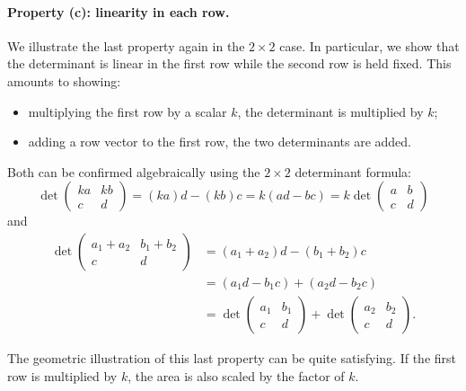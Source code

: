 \documentclass{ximera}
\begin{document}
\paragraph{Property (c): linearity in each row.}
We illustrate the last property again in the $2 \times 2$ case. In
particular, we show that the determinant is linear in the first row
while the second row is held fixed. This amounts to showing:
\begin{itemize}
\item multiplying the first row by a scalar $k$, the determinant is
  multiplied by $k$;
\item adding a row vector to the first row, the two determinants are added.
\end{itemize}

Both can be confirmed algebraically using the $2 \times 2$ determinant
formula:
\[
  \det
  \begin{pmatrix}
    k a & k b \\
    c & d
  \end{pmatrix}
  = (k a)d - (k b)c
  = k (ad - bc)
  = k \det
  \begin{pmatrix}
    a & b \\
    c & d
  \end{pmatrix}
\]
and
\begin{align*}
  \det
  \begin{pmatrix}
    a_1 + a_2 & b_1 + b_2 \\
    c & d
  \end{pmatrix}
  & = (a_1 + a_2) d - (b_1 + b_2) c \\
              & = (a_1 d - b_1 c) + (a_2 d - b_2 c) \\
              & = \det
                \begin{pmatrix}
                  a_1 & b_1 \\
                  c & d
                \end{pmatrix}
                + \det
                \begin{pmatrix}
                  a_2 & b_2 \\
                  c & d
                \end{pmatrix}.
\end{align*}

The geometric illustration of this last property can be quite
satisfying. If the first row is multiplied by $k$, the area is also
scaled by the factor of $k$.
\end{document}
